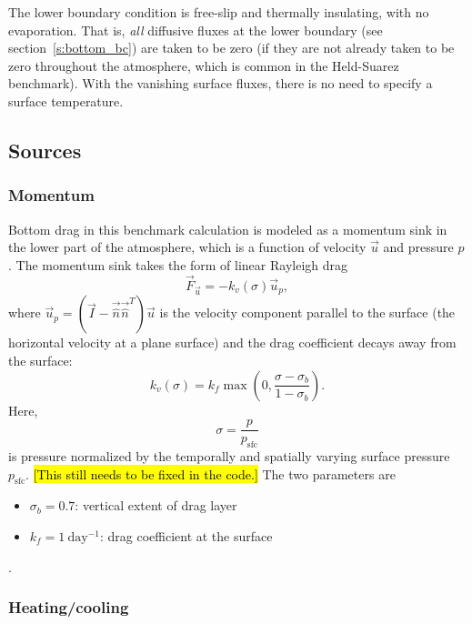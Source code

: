 \documentclass{report}
\begin{document}
The lower boundary condition is free-slip and thermally insulating, with no evaporation. That is, \emph{all} diffusive fluxes at the lower boundary (see section~\ref{s:bottom_bc}) are taken to be zero (if they are not already taken to be zero throughout the atmosphere, which is common in the Held-Suarez benchmark). With the vanishing surface fluxes, there is no need to specify a surface temperature.

\subsection{Sources}

\subsubsection{Momentum} 

Bottom drag in this benchmark calculation is modeled as a momentum sink in the lower part of the atmosphere, which is a function of velocity $\vec{u}$ and pressure $p$. The momentum sink takes the form of linear Rayleigh drag
\begin{equation}
    \vec{F}_{\vec{u}} = -k_v(\sigma) \vec{u}_p,
\end{equation}
where $\vec{u}_p = (\vec{I} - \vec{\hat n}\vec{\hat n}^T)\vec{u}$ is the velocity component parallel to the surface (the horizontal velocity at a plane surface) and the drag coefficient decays away from the surface:
\begin{equation}
    k_v(\sigma) = k_f \max \left( 0, \frac{\sigma - \sigma_b}{1-\sigma_b} \right).
\end{equation}
Here,
\[
\sigma = \frac{p}{p_{\mathrm{sfc}}}
\]
is pressure normalized by the temporally and spatially varying surface pressure $p_{\mathrm{sfc}}$. \hl{[This still needs to be fixed in the code.]} The two parameters are
\begin{itemize}
    \item $\sigma_b = 0.7$: vertical extent of drag layer
    \item $k_f = 1~\mathrm{day^{-1}}$: drag coefficient at the surface
\end{itemize}.

\subsubsection{Heating/cooling}
\end{document}
